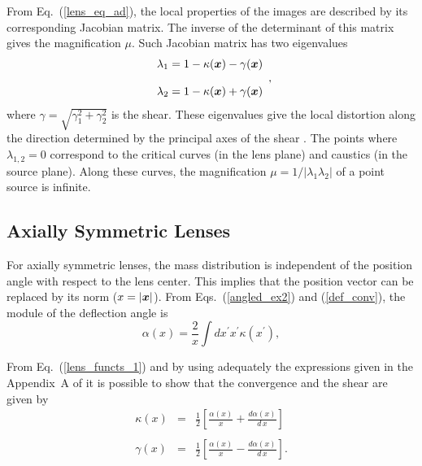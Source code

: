 \documentclass[useAMS,usenatbib]{mn2e}
\begin{document}
From Eq.~(\ref{lens_eq_ad}), the local properties of the images are described by its corresponding Jacobian matrix. The inverse of the determinant of this matrix gives the magnification $\mu$. Such Jacobian matrix has two eigenvalues
\begin{equation}\label{eigv_1-2}
\begin{array}{l}
\lambda_{1}= 1-\kappa(\bmath{x})-\gamma(\bmath{x})  \\
\\
\lambda_{2}= 1-\kappa(\bmath{x})+\gamma(\bmath{x})
\end{array},
\end{equation}
where $\gamma=\sqrt{\gamma_1^2+\gamma_2^2}$ is the shear.  These eigenvalues give the local distortion along the direction determined by the principal axes of the shear \citep{miralda91}.  The points where  $\lambda_{1,2}=0$ correspond to the critical curves (in the lens plane) and caustics (in the source plane). Along these curves, the magnification $\mu=1/|\lambda_{1}\lambda_{2}|$ of a point source is infinite.

\subsection{Axially Symmetric Lenses}
For axially symmetric lenses, the mass distribution is independent of the position angle with respect to the lens center. This implies that the position vector can be replaced by its norm ($x=|\bmath{x}|$). From Eqs.~(\ref{angled_ex2}) and (\ref{def_conv}), the module of the deflection angle is
\begin{equation}
\alpha(x)=\frac{2}{x}\int d x^\prime  x^\prime \kappa(x^\prime), \label{alpha_circ}
\end{equation}

 From Eq.~(\ref{lens_functs_1}) and  by using adequately the expressions given in the Appendix~A of \citet[][hereafter DMCM]{dm_2011} it is possible to show that the convergence and the shear are given by
\begin{eqnarray}
\kappa(x)&=&\frac{1}{2}\left[ \frac{\alpha(x)}{x}+\frac{d \alpha(x)}{d\,x}\right] \nonumber \\
\label{kappa-gamma_circ} \\
\gamma(x)&=&\frac{1}{2}\left[ \frac{\alpha(x)}{x}-\frac{d \alpha(x)}{d\,x}\right].\nonumber
\end{eqnarray}
\end{document}
